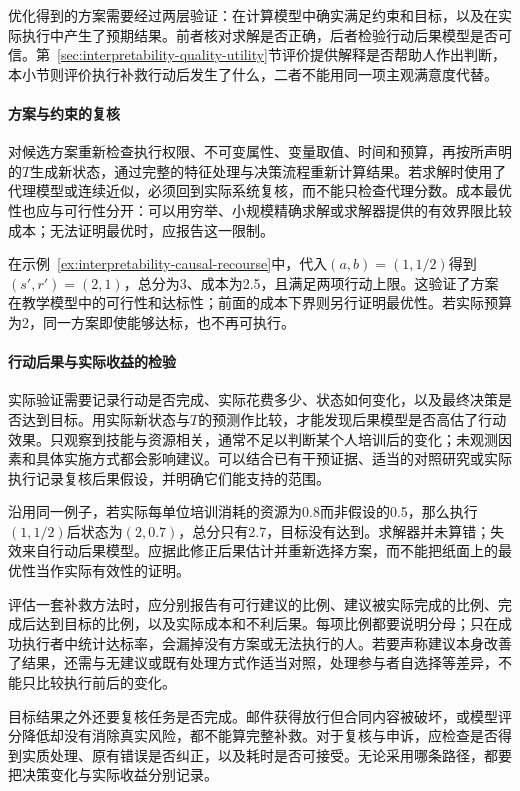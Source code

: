 优化得到的方案需要经过两层验证：在计算模型中确实满足约束和目标，以及在实际执行中产生了预期结果。前者核对求解是否正确，后者检验行动后果模型是否可信。第~\ref{sec:interpretability-quality-utility}节评价提供解释是否帮助人作出判断，本小节则评价执行补救行动后发生了什么，二者不能用同一项主观满意度代替。

\paragraph{方案与约束的复核}

对候选方案重新检查执行权限、不可变属性、变量取值、时间和预算，再按所声明的$T$生成新状态，通过完整的特征处理与决策流程重新计算结果。若求解时使用了代理模型或连续近似，必须回到实际系统复核，而不能只检查代理分数。成本最优性也应与可行性分开：可以用穷举、小规模精确求解或求解器提供的有效界限比较成本；无法证明最优时，应报告这一限制。

在示例~\ref{ex:interpretability-causal-recourse}中，代入$(a,b)=(1,1/2)$得到$(s',r')=(2,1)$，总分为3、成本为2.5，且满足两项行动上限。这验证了方案在教学模型中的可行性和达标性；前面的成本下界则另行证明最优性。若实际预算为2，同一方案即使能够达标，也不再可执行。

\paragraph{行动后果与实际收益的检验}

实际验证需要记录行动是否完成、实际花费多少、状态如何变化，以及最终决策是否达到目标。用实际新状态与$T$的预测作比较，才能发现后果模型是否高估了行动效果。只观察到技能与资源相关，通常不足以判断某个人培训后的变化；未观测因素和具体实施方式都会影响建议。可以结合已有干预证据、适当的对照研究或实际执行记录复核后果假设，并明确它们能支持的范围。

沿用同一例子，若实际每单位培训消耗的资源为0.8而非假设的0.5，那么执行$(1,1/2)$后状态为$(2,0.7)$，总分只有2.7，目标没有达到。求解器并未算错；失效来自行动后果模型。应据此修正后果估计并重新选择方案，而不能把纸面上的最优性当作实际有效性的证明。

评估一套补救方法时，应分别报告有可行建议的比例、建议被实际完成的比例、完成后达到目标的比例，以及实际成本和不利后果。每项比例都要说明分母；只在成功执行者中统计达标率，会漏掉没有方案或无法执行的人。若要声称建议本身改善了结果，还需与无建议或既有处理方式作适当对照，处理参与者自选择等差异，不能只比较执行前后的变化。

目标结果之外还要复核任务是否完成。邮件获得放行但合同内容被破坏，或模型评分降低却没有消除真实风险，都不能算完整补救。对于复核与申诉，应检查是否得到实质处理、原有错误是否纠正，以及耗时是否可接受。无论采用哪条路径，都要把决策变化与实际收益分别记录。

